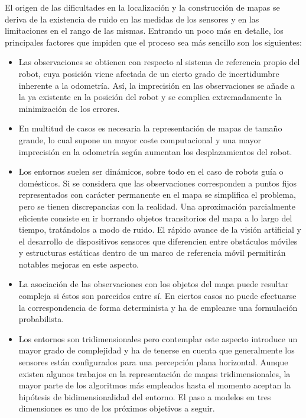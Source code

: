 El origen de las dificultades en la localización y la construcción de mapas se deriva de la existencia de ruido en las medidas de los sensores y en las limitaciones en el rango de las mismas. Entrando un poco más en detalle, los principales factores que impiden que el proceso sea más sencillo son los siguientes:
\begin{itemize}
  \item  Las observaciones se obtienen con respecto al sistema de referencia propio del robot, cuya posición viene afectada de un cierto grado de incertidumbre inherente a la odometría. Así, la imprecisión en las observaciones se añade a la ya existente en la posición del robot y se complica extremadamente la minimización de los errores.
  \item En multitud de casos es necesaria la representación de mapas de tamaño grande, lo cual supone un mayor coste computacional y una mayor imprecisión en la odometría según aumentan los desplazamientos del robot.
  \item Los entornos suelen ser dinámicos, sobre todo en el caso de robots guía o domésticos. Si se considera que las observaciones corresponden a puntos fijos representados con carácter permanente en el mapa se simplifica el problema, pero se tienen discrepancias con la realidad. Una aproximación parcialmente eficiente consiste en ir borrando objetos transitorios del mapa a lo largo del tiempo, tratándolos a modo de ruido. El rápido avance de la visión artificial y el desarrollo de dispositivos sensores que diferencien entre obstáculos móviles y estructuras estáticas dentro de un marco de referencia móvil permitirán notables mejoras en este aspecto.
  \item La asociación de las observaciones con los objetos del mapa puede resultar compleja si éstos son parecidos entre sí. En ciertos casos no puede efectuarse la correspondencia de forma determinista y ha de emplearse una formulación probabilista.
  \item Los entornos son tridimensionales pero contemplar este aspecto introduce un mayor grado de complejidad y ha de tenerse en cuenta que generalmente los sensores están configurados para una percepción plana horizontal. Aunque existen algunos trabajos en la representación de mapas tridimensionales, la mayor parte de los algoritmos más empleados hasta el momento aceptan la hipótesis de bidimensionalidad del entorno. El paso a modelos en tres dimensiones es uno de los próximos objetivos a seguir.
\end{itemize}

